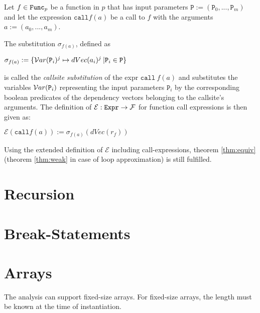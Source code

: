 \begin{definition}
    Let $f \in \mathtt{Func}_p$ be a function in $p$ that has input parameters $\mathtt{P} := (\mathtt{P}_0,...,\mathtt{P}_m)$ and let the expression $\mathtt{call} f(a)$ be a call to $f$ with the arguments $a := (a_0,..., a_m)$.
    
    The substitution $\sigma_{f(a)}$, defined as
    \begin{center}
        $\sigma_{f(a)} := \{ \mathcal{V}ar(\mathtt{P}_i)^j \mapsto dVec(a_i)^j \: |  \mathtt{P}_i \in \mathtt{P}\}$
    \end{center}
    is called the \emph{callsite substitution} of the expr $\mathtt{call} \: f(a)$ and substitutes the variables $\mathcal{V}ar(\mathtt{P}_i)$ representing the input parameters $\mathtt{P}_i$ by the corresponding boolean predicates of the dependency vectors belonging to the callsite's arguments.
    The definition of $\mathcal{E}: \mathtt{Expr} \to \mathcal{F}$ for function call expressions is then given as:
    \begin{center}
        $\mathcal{E}(\mathtt{call} f(a)) := \sigma_{f(a)} (dVec(r_f))$
    \end{center}
\end{definition}

\begin{lemma}
Using the extended definition of $\mathcal{E}$ including call-expressions, theorem \ref{thm:equiv} (theorem \ref{thm:weak} in case of loop approximation) is still fulfilled.
\end{lemma}

\section{Recursion}

\section{Break-Statements}

\section{Arrays}
The analysis can support fixed-size arrays. For fixed-size arrays, the length must be known at the time of instantiation.